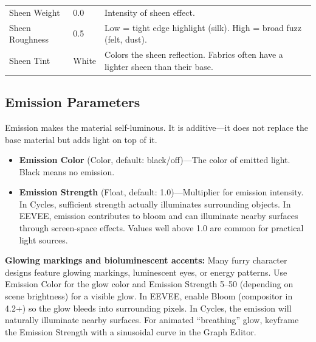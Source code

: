 \begin{center}
\begin{tabularx}{\textwidth}{L{3.5cm}C{2.5cm}X}
\toprule
{}
 &  &  \\
\midrule
Sheen Weight & 0.0 & Intensity of sheen effect. \\
Sheen Roughness & 0.5 & Low = tight edge highlight (silk). High = broad fuzz (felt, dust). \\
Sheen Tint & White & Colors the sheen reflection. Fabrics often have a lighter sheen than their base. \\
\bottomrule
\end{tabularx}
\end{center}

\subsection{Emission Parameters}
\label{sec:shading:principled:emission}

Emission makes the material self-luminous. It is additive---it does
not replace the base material but adds light on top of it.

\begin{itemize}[leftmargin=2em]
  \item \textbf{Emission Color} (Color, default: black/off)---The
        color of emitted light. Black means no emission.
  \item \textbf{Emission Strength} (Float, default: 1.0)---Multiplier
        for emission intensity. In Cycles, sufficient strength
        actually illuminates surrounding objects. In EEVEE, emission
        contributes to bloom and can illuminate nearby surfaces
        through screen-space effects. Values well above 1.0 are
        common for practical light sources.
\end{itemize}

\begin{furrybox}
\textbf{Glowing markings and bioluminescent accents:} Many furry
character designs feature glowing markings, luminescent eyes, or
energy patterns. Use Emission Color for the glow color and Emission
Strength 5--50 (depending on scene brightness) for a visible glow.
In EEVEE, enable Bloom (compositor in 4.2+) so the glow bleeds
into surrounding pixels. In Cycles, the emission will naturally
illuminate nearby surfaces. For animated ``breathing'' glow, keyframe
the Emission Strength with a sinusoidal curve in the Graph Editor.
\end{furrybox}

